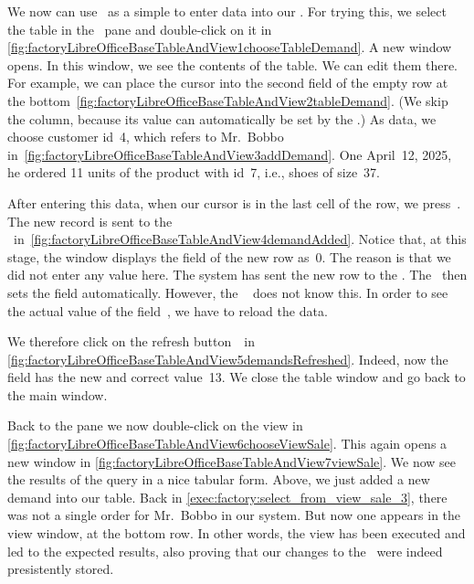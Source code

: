 %
We now can use \libreofficeBase\ as a simple  to enter data into our \db.
For trying this, we select the table  in the ~pane and double-click on it in \cref{fig:factoryLibreOfficeBaseTableAndView1chooseTableDemand}.
A new window opens.
In this window, we see the contents of the table.
We can edit them there.
For example, we can place the cursor into the second field of the empty row at the bottom~\cref{fig:factoryLibreOfficeBaseTableAndView2tableDemand}.
(We skip the  column, because its value can automatically be set by the \dbms.)
As data, we choose customer id~4, which refers to Mr.~Bobbo in~\cref{fig:factoryLibreOfficeBaseTableAndView3addDemand}.
One April~12, 2025, he ordered 11 units of the product with id~7, i.e., shoes of size~37.

After entering this data, when our cursor is in the last cell of the row, we press~\keys{\tab}.
The new record is sent to the \dbms\ in~\cref{fig:factoryLibreOfficeBaseTableAndView4demandAdded}.
Notice that, at this stage, the window displays the  field of the new row as~0.
The reason is that we did not enter any value here.
The system has sent the new row to the \dbms.
The \dbms\ then sets the  field automatically.
However, the \libreofficeBase\  does not know this.
In order to see the actual value of the field~, we have to reload the data.

We therefore click on the refresh button~\libreOfficeBaseRefresh\ in \cref{fig:factoryLibreOfficeBaseTableAndView5demandsRefreshed}.
Indeed, now the  field has the new and correct value~13.
We close the table window and go back to the main window.

Back to the  pane we now double-click on the view  in \cref{fig:factoryLibreOfficeBaseTableAndView6chooseViewSale}.
This again opens a new window in \cref{fig:factoryLibreOfficeBaseTableAndView7viewSale}.
We now see the results of the query in a nice tabular form.
Above, we just added a new demand into our table.
Back in \cref{exec:factory:select_from_view_sale_3}, there was not a single order for Mr.~Bobbo in our system.
But now one appears in the view window, at the bottom row.
In other words, the view has been executed and led to the expected results, also proving that our changes to the \db\ were indeed presistently stored.%
%
\FloatBarrier%
\endhsection%
%

